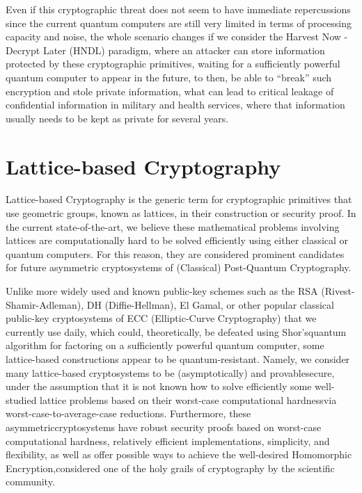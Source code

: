 \documentclass[runningheads]{llncs}
\numberwithin{equation}{section}
\begin{document}
    Even if this cryptographic threat does not seem to have immediate repercussions since the current quantum computers are still very limited in terms of processing capacity and noise, the whole scenario changes if we consider the Harvest Now - Decrypt Later (HNDL) paradigm, where an attacker can store information protected by these cryptographic primitives, waiting for a sufficiently powerful quantum computer to appear in the future, to then, be able to ``break'' such encryption and stole private information, what can lead to critical leakage of confidential information in military and health services, where that information usually needs to be kept as private for several years.
    
    \newpage

    
    \section{Lattice-based Cryptography}
    \label{sec:lattice-based-cryptography}

    Lattice-based Cryptography is the generic term for cryptographic primitives that use geometric groups, known as lattices, in their construction or security proof. In the current state-of-the-art, we believe these mathematical problems involving lattices are computationally hard to be solved efficiently using either classical or quantum computers. For this reason, they are considered prominent candidates for future asymmetric cryptosystems of (Classical) Post-Quantum Cryptography.

    Unlike more widely used and known public-key schemes such as the RSA (Rivest-Shamir-Adleman), DH (Diffie-Hellman), El Gamal, or other popular classical public-key cryptosystems of ECC (Elliptic-Curve Cryptography) that we currently use daily, which could, theoretically, be defeated using Shor's\break quantum algorithm for factoring on a sufficiently powerful quantum computer, some lattice-based constructions appear to be quantum-resistant. Namely, we consider many lattice-based cryptosystems to be (asymptotically) and provable\break secure, under the assumption that it is not known how to solve efficiently some well-studied lattice problems based on their worst-case computational hardness\break via worst-case-to-average-case reductions. Furthermore, these asymmetric\break cryptosystems have robust security proofs based on worst-case computational hardness, relatively efficient implementations, simplicity, and flexibility, as well as offer possible ways to achieve the well-desired Homomorphic Encryption,\break considered one of the holy grails of cryptography by the scientific community.
    
\end{document}
